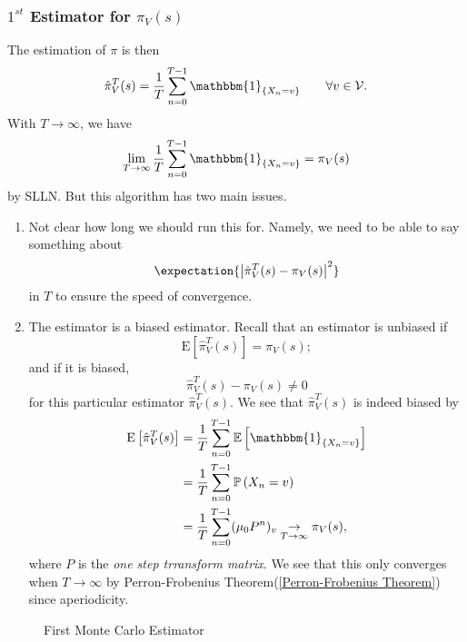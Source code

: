 \subsubsection{\(1^{st}\) Estimator for \(\pi_V(s)\)}
The estimation of \(\pi\) is then
\[
	\hat{\pi}^{T}_{V}(s) = \frac{1}{T}\sum\limits_{n=0}^{T-1} \mathbbm{1}_{\{X_n = v\}}\qquad \forall v\in \mathcal{V}.
\]
With \(T\to \infty \), we have
\[
	\lim_{T\to \infty}\frac{1}{T} \sum\limits_{n=0}^{T-1} \mathbbm{1}_{\{X_n = v\}} = \pi_V(s)
\]
by SLLN. But this algorithm has two main issues.
\begin{enumerate}
	\item Not clear how long we should run this for. Namely, we need to be able to say something about
	      \[
		      \expectation{\left\vert \hat{\pi}^{T}_V(s) - \pi_V(s) \right\vert^2 }
	      \]
	      in \(T\) to ensure the speed of convergence.
	\item The estimator is a biased estimator. Recall that an estimator is unbiased if
	      \[
		      \mathrm{E}\left[ \hat{\pi}_{V}^{T}(s) \right] = \pi_V(s);
	      \]
	      and if it is biased,
	      \[
		      \hat{\pi}_{V}^{T}(s) - \pi_V(s)\neq 0
	      \]
	      for this particular estimator \(\hat{\pi}^{T}_V(s)\). We see that \(\hat{\pi}^{T}_V(s)\) is indeed biased by
	      \[
		      \begin{split}
			      \mathrm{E}\left[\hat{\pi}^{T}_V(s)\right] &= \frac{1}{T}\sum\limits_{n=0}^{T-1} \mathbb{\MakeUppercase{E}}\left[ \mathbbm{1}_{\{X_n = v\}} \right]\\
			      &= \frac{1}{T}\sum\limits_{n=0}^{T-1} \mathbb{\MakeUppercase{P}}\left( X_n = v \right) \\
			      &= \frac{1}{T}\sum\limits_{n=0}^{T-1} (\mu_0 P^n)_v\underset{T\to \infty }{\to }\pi_V(s),
		      \end{split}
	      \]
	      where \(P\) is the \emph{one step trransform matrix}. We see that this only converges when \(T\to \infty \) by Perron-Frobenius Theorem(\autoref{Perron-Frobenius Theorem})
	      since aperiodicity.
\end{enumerate}

\begin{figure}[H]
	\centering
	\caption{First Monte Carlo Estimator}
	\label{fig:Monte-Carlo-Estimator-1}
\end{figure}


